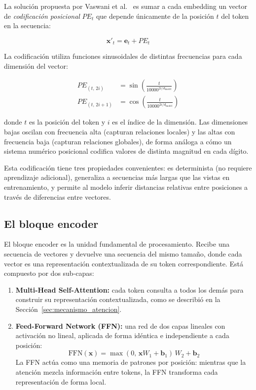 La solución propuesta por Vaswani et al.~\cite{vaswani2017attention} es
sumar a cada embedding un vector de \textit{codificación posicional} $PE_t$
que depende únicamente de la posición $t$ del token en la secuencia:

\begin{equation}
    \bm{x}'_t = \bm{e}_t + PE_t
\end{equation}

La codificación utiliza funciones sinusoidales de distintas frecuencias
para cada dimensión del vector:

\begin{align}
    PE_{(t,\, 2i)}   &= \sin\!\left(\frac{t}{10000^{2i/d_{\text{model}}}}\right) \\[4pt]
    PE_{(t,\, 2i+1)} &= \cos\!\left(\frac{t}{10000^{2i/d_{\text{model}}}}\right)
\end{align}

\noindent donde $t$ es la posición del token y $i$ es el índice de la
dimensión. Las dimensiones bajas oscilan con frecuencia alta (capturan
relaciones locales) y las altas con frecuencia baja (capturan relaciones
globales), de forma análoga a cómo un sistema numérico posicional codifica
valores de distinta magnitud en cada dígito.

Esta codificación tiene tres propiedades convenientes: es determinista
(no requiere aprendizaje adicional), generaliza a secuencias más largas
que las vistas en entrenamiento, y permite al modelo inferir distancias
relativas entre posiciones a través de diferencias entre vectores.



\subsection{El bloque encoder}
\label{subsec:bloque_encoder}

El bloque encoder es la unidad fundamental de procesamiento. Recibe una
secuencia de vectores y devuelve una secuencia del mismo tamaño, donde
cada vector es una representación contextualizada de su token
correspondiente. Está compuesto por dos sub-capas:

\begin{enumerate}
    \item \textbf{Multi-Head Self-Attention:} cada token consulta a todos
    los demás para construir su representación contextualizada, como se
    describió en la Sección~\ref{sec:mecanismo_atencion}.

    \item \textbf{Feed-Forward Network (FFN):} una red de dos capas
    lineales con activación no lineal, aplicada de forma idéntica e
    independiente a cada posición:
    \begin{equation}
        \text{FFN}(\bm{x}) = \max(0,\, \bm{x} W_1 + \bm{b}_1)\, W_2 + \bm{b}_2
    \end{equation}
    La FFN actúa como una memoria de patrones por posición: mientras que
    la atención mezcla información entre tokens, la FFN transforma cada
    representación de forma local.
\end{enumerate}

